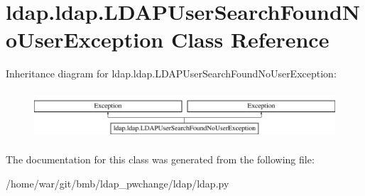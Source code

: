 \hypertarget{classldap_1_1ldap_1_1LDAPUserSearchFoundNoUserException}{\section{ldap.\-ldap.\-L\-D\-A\-P\-User\-Search\-Found\-No\-User\-Exception Class Reference}
\label{classldap_1_1ldap_1_1LDAPUserSearchFoundNoUserException}
}
Inheritance diagram for ldap.\-ldap.\-L\-D\-A\-P\-User\-Search\-Found\-No\-User\-Exception\-:\begin{figure}[H]
\begin{center}
\leavevmode
\includegraphics[height=1.812298cm]{classldap_1_1ldap_1_1LDAPUserSearchFoundNoUserException}
\end{center}
\end{figure}


The documentation for this class was generated from the following file\-:\begin{DoxyCompactItemize}
\item 
/home/war/git/bmb/ldap\-\_\-pwchange/ldap/ldap.\-py\end{DoxyCompactItemize}
